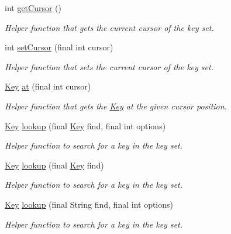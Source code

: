 \begin{DoxyCompactItemize}
int \mbox{\hyperlink{classorg_1_1libelektra_1_1KeySet_a37e6d574b4595021a6cc732e325219e1}{get\+Cursor}} ()
\begin{DoxyCompactList}\small\item\em Helper function that gets the current cursor of the key set. \end{DoxyCompactList}\item 
int \mbox{\hyperlink{classorg_1_1libelektra_1_1KeySet_adb3caad35c8dfcd1934d7cd32ff0ca4a}{set\+Cursor}} (final int cursor)
\begin{DoxyCompactList}\small\item\em Helper function that sets the current cursor of the key set. \end{DoxyCompactList}\item 
\mbox{\hyperlink{classorg_1_1libelektra_1_1Key}{Key}} \mbox{\hyperlink{classorg_1_1libelektra_1_1KeySet_a125d86734bd428c9eb1f937eb1b7ab74}{at}} (final int cursor)
\begin{DoxyCompactList}\small\item\em Helper function that gets the \mbox{\hyperlink{classorg_1_1libelektra_1_1Key}{Key}} at the given cursor position. \end{DoxyCompactList}\item 
\mbox{\hyperlink{classorg_1_1libelektra_1_1Key}{Key}} \mbox{\hyperlink{classorg_1_1libelektra_1_1KeySet_a6fb319a768b1cb43464154a93f9a2e93}{lookup}} (final \mbox{\hyperlink{classorg_1_1libelektra_1_1Key}{Key}} find, final int options)
\begin{DoxyCompactList}\small\item\em Helper function to search for a key in the key set. \end{DoxyCompactList}\item 
\mbox{\hyperlink{classorg_1_1libelektra_1_1Key}{Key}} \mbox{\hyperlink{classorg_1_1libelektra_1_1KeySet_a9ff1d475fd6ae316515c4c1cc173991b}{lookup}} (final \mbox{\hyperlink{classorg_1_1libelektra_1_1Key}{Key}} find)
\begin{DoxyCompactList}\small\item\em Helper function to search for a key in the key set. \end{DoxyCompactList}\item 
\mbox{\hyperlink{classorg_1_1libelektra_1_1Key}{Key}} \mbox{\hyperlink{classorg_1_1libelektra_1_1KeySet_aa17a04907eb8c8d2a9a488788d0039ea}{lookup}} (final String find, final int options)
\begin{DoxyCompactList}\small\item\em Helper function to search for a key in the key set. \end{DoxyCompactList}\item 

\end{DoxyCompactItemize}
